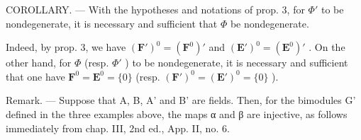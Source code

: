 COROLLARY. --- With the hypotheses and notations of prop. 3, for \(\Phi'\) to be nondegenerate, it is necessary and sufficient that \(\Phi\) be nondegenerate.

Indeed, by prop. 3, we have \((\mathbf{F}')^0 = (\mathbf{F}^0)'\) and \((\mathbf{E}')^0 = (\mathbf{E}^0)'\) . On the other hand, for \(\Phi\) (resp. \(\Phi'\) ) to be nondegenerate, it is necessary and sufficient that one have \(\mathbf{F}^0 = \mathbf{E}^0 = \{0\}\) (resp. \((\mathbf{F}')^0 = (\mathbf{E}')^0 = \{0\}\) ).

Remark. --- Suppose that A, B, A' and B' are fields. Then, for the bimodules G' defined in the three examples above, the maps α and β are injective, as follows immediately from chap. III, 2nd ed., App. II, no. 6.

